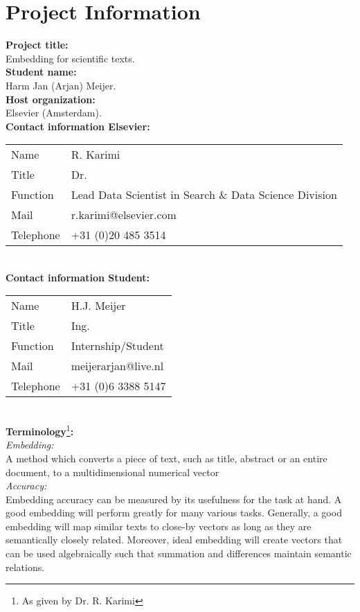 \documentclass[10pt,a4paper]{article}
\newcommand\tab[1][1cm]{\hspace*{#1}}
\newcommand\vtab[1][0.2cm]{\vspace*{#1}}
\begin{document}
\section{Project Information}
\textbf{Project title:}\\
\tab Embedding for scientific texts.\vtab\\
\textbf{Student name:}\\\tab
Harm Jan (Arjan) Meijer.\vtab\\
\textbf{Host organization:}\\\tab
Elsevier (Amsterdam).\vtab\\
\textbf{Contact information Elsevier:}\\\tab
\vtab\begin{tabular}{ll}
Name      & R. Karimi                                              \\
Title     & Dr.                                                    \\
Function  & Lead Data Scientist in Search \& Data Science Division \\
Mail      & r.karimi@elsevier.com                                  \\
Telephone & +31 (0)20 485 3514                                    
\end{tabular}\\
\textbf{Contact information Student:}\\\tab
\vtab\begin{tabular}{ll}
Name      & H.J. Meijer\\
Title     & Ing.\\
Function  & Internship/Student \\
Mail      & meijerarjan@live.nl \\
Telephone & +31 (0)6 3388 5147  \\                                 
\end{tabular}\\
\textbf{Terminology}\footnote{As given by Dr. R. Karimi}\textbf{:}
\vtab\\\textit{Embedding:}\\ A method which converts a piece of text, such as title, abstract or an entire document, to a multidimensional numerical vector
\vtab\\\textit{Accuracy:}\\Embedding accuracy can be measured by its usefulness for the task at hand.  A good embedding will perform greatly for many various tasks. Generally, a good embedding will map similar texts to close-by vectors as long as they are semantically closely related. Moreover, ideal embedding will create vectors that can be used algebraically such that summation and differences maintain semantic relations.
\newpage
\end{document}
